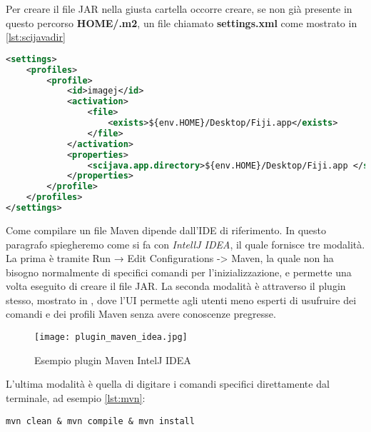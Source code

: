 \noindent Per creare il file JAR nella giusta cartella occorre creare, se non già presente in questo percorso
\textbf{HOME/.m2}, un file chiamato \textbf{settings.xml} come mostrato in \ref{lst:scijavadir}

\begin{lstlisting}[language=XML, caption={"settings.xml valido per Fiji}, label={lst:scijavadir}]
<settings>
    <profiles>
        <profile>
            <id>imagej</id>
            <activation>
                <file>
                    <exists>${env.HOME}/Desktop/Fiji.app</exists>
                </file>
            </activation>
            <properties>
                <scijava.app.directory>${env.HOME}/Desktop/Fiji.app </scijava.app.directory>
            </properties>
        </profile>
    </profiles>
</settings>
\end{lstlisting}

\noindent Come compilare un file Maven dipende dall'IDE di riferimento. In questo paragrafo spiegheremo come si fa con \textit{IntellJ IDEA}, il quale fornisce tre modalità. La prima è tramite Run → Edit Configurations -> Maven, la quale non ha bisogno normalmente di specifici comandi per l'inizializzazione, e permette una volta eseguito di creare il file JAR. La seconda modalità è attraverso il plugin stesso, mostrato in , dove l'UI permette agli utenti meno esperti di usufruire dei comandi e dei profili Maven senza avere conoscenze pregresse.

\begin{figure}[H]
    \centering
    \texttt{[image: plugin\_maven\_idea.jpg]}
    \caption{Esempio plugin Maven IntelJ IDEA}
    \label{fig:8}
\end{figure}

\noindent L'ultima modalità è quella di digitare i comandi specifici direttamente dal terminale, ad esempio \ref{lst:mvn}:
\begin{lstlisting}[label={lst:mvn}, caption={Esempio per pulire, compilare e creare il file JAR}]
    mvn clean & mvn compile & mvn install
\end{lstlisting}

